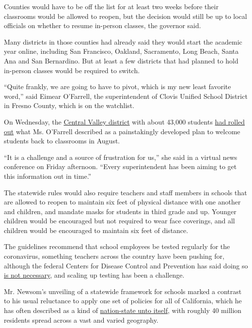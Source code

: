 Counties would have to be off the list for at least two weeks before
their classrooms would be allowed to reopen, but the decision would
still be up to local officials on whether to resume in-person classes,
the governor said.

Many districts in those counties had already said they would start the
academic year online, including San Francisco, Oakland, Sacramento, Long
Beach, Santa Ana and San Bernardino. But at least a few districts that
had planned to hold in-person classes would be required to switch.

``Quite frankly, we are going to have to pivot, which is my new least
favorite word,'' said Eimear O'Farrell, the superintendent of Clovis
Unified School District in Fresno County, which is on the watchlist.

On Wednesday, the
\href{https://www.cusd.com/CUSDAt-A-Glance.aspx}{Central Valley
district} with about 43,000 students
\href{https://www.fresnobee.com/news/coronavirus/article244300057.html}{had
rolled out} what Ms. O'Farrell described as a painstakingly developed
plan to welcome students back to classrooms in August.

``It is a challenge and a source of frustration for us,'' she said in a
virtual news conference on Friday afternoon. ``Every superintendent has
been aiming to get this information out in time.''

The statewide rules would also require teachers and staff members in
schools that are allowed to reopen to maintain six feet of physical
distance with one another and children, and mandate masks for students
in third grade and up. Younger children would be encouraged but not
required to wear face coverings, and all children would be encouraged to
maintain six feet of distance.

The guidelines recommend that school employees be tested regularly for
the coronavirus, something teachers across the country have been pushing
for, although the federal Centers for Disease Control and Prevention has
said doing so
\href{https://www.cdc.gov/coronavirus/2019-ncov/community/schools-childcare/k-12-testing.html}{is
not necessary}, and scaling up testing has been a challenge.

Mr. Newsom's unveiling of a statewide framework for schools marked a
contrast to his usual reluctance to apply one set of policies for all of
California, which he has often described as a kind of
\href{https://www.nytimes3xbfgragh.onion/2020/04/14/us/california-coronavirus-newsom-nation-state.html}{nation-state
unto itself}, with roughly 40 million residents spread across a vast and
varied geography.

